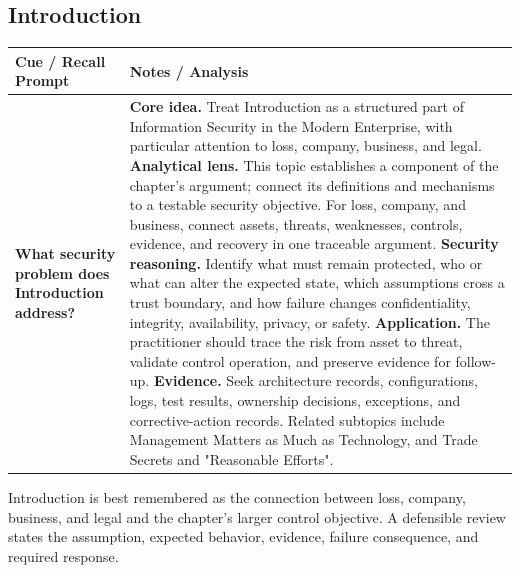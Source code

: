 \documentclass[11pt]{article}
\newcommand{\CornellHeader}{%
\rowcolor{Navy}\color{white}\bfseries Cue / Recall Prompt & \color{white}\bfseries Notes / Analysis\\\hline}
\newcommand{\CornellRow}[2]{%
\cellcolor{CueGray}\RaggedRight\textbf{#1} & \RaggedRight #2\\\hline}
\begin{document}
\subsection*{Introduction}
\begin{longtable}{>{\RaggedRight\arraybackslash}p{}|>{\RaggedRight\arraybackslash}p{}}
\CornellHeader
\CornellRow{What security problem does Introduction address?}{\textbf{Core idea.} Treat Introduction as a structured part of Information Security in the Modern Enterprise, with particular attention to loss, company, business, and legal. \textbf{Analytical lens.} This topic establishes a component of the chapter's argument; connect its definitions and mechanisms to a testable security objective. For loss, company, and business, connect assets, threats, weaknesses, controls, evidence, and recovery in one traceable argument. \textbf{Security reasoning.} Identify what must remain protected, who or what can alter the expected state, which assumptions cross a trust boundary, and how failure changes confidentiality, integrity, availability, privacy, or safety. \textbf{Application.} The practitioner should trace the risk from asset to threat, validate control operation, and preserve evidence for follow-up. \textbf{Evidence.} Seek architecture records, configurations, logs, test results, ownership decisions, exceptions, and corrective-action records. Related subtopics include Management Matters as Much as Technology, and Trade Secrets and "Reasonable Efforts".}
\end{longtable}
\begin{topicsummary}
Introduction is best remembered as the connection between loss, company, business, and legal and the chapter's larger control objective. A defensible review states the assumption, expected behavior, evidence, failure consequence, and required response.
\end{topicsummary}
\end{document}
